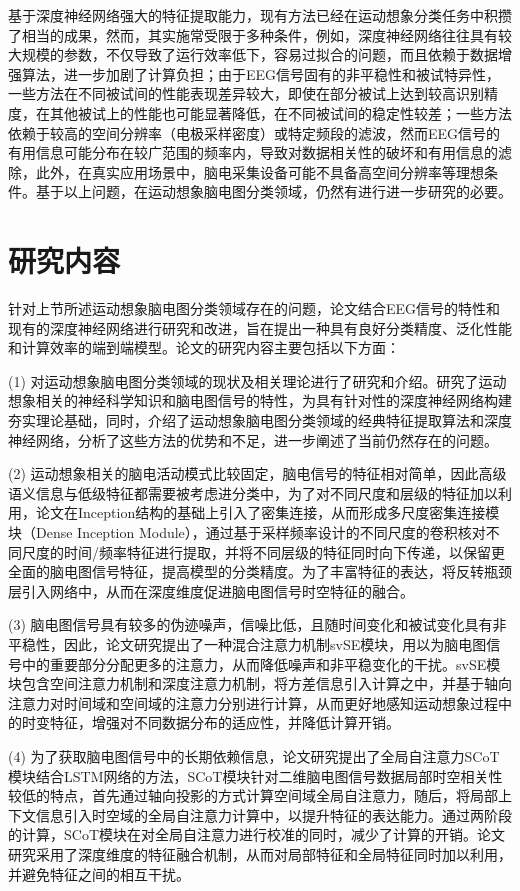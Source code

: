 基于深度神经网络强大的特征提取能力，现有方法已经在运动想象分类任务中积攒了相当的成果，然而，其实施常受限于多种条件，例如，深度神经网络往往具有较大规模的参数，不仅导致了运行效率低下，容易过拟合的问题，而且依赖于数据增强算法，进一步加剧了计算负担；由于EEG信号固有的非平稳性和被试特异性，一些方法在不同被试间的性能表现差异较大，即使在部分被试上达到较高识别精度，在其他被试上的性能也可能显著降低，在不同被试间的稳定性较差；一些方法依赖于较高的空间分辨率（电极采样密度）或特定频段的滤波，然而EEG信号的有用信息可能分布在较广范围的频率内，导致对数据相关性的破坏和有用信息的滤除，此外，在真实应用场景中，脑电采集设备可能不具备高空间分辨率等理想条件。基于以上问题，在运动想象脑电图分类领域，仍然有进行进一步研究的必要。

\section{研究内容}

针对上节所述运动想象脑电图分类领域存在的问题，论文结合EEG信号的特性和现有的深度神经网络进行研究和改进，旨在提出一种具有良好分类精度、泛化性能和计算效率的端到端模型。论文的研究内容主要包括以下方面：

(1) 对运动想象脑电图分类领域的现状及相关理论进行了研究和介绍。研究了运动想象相关的神经科学知识和脑电图信号的特性，为具有针对性的深度神经网络构建夯实理论基础，同时，介绍了运动想象脑电图分类领域的经典特征提取算法和深度神经网络，分析了这些方法的优势和不足，进一步阐述了当前仍然存在的问题。

(2) 运动想象相关的脑电活动模式比较固定，脑电信号的特征相对简单，因此高级语义信息与低级特征都需要被考虑进分类中，为了对不同尺度和层级的特征加以利用，论文在Inception结构的基础上引入了密集连接，从而形成多尺度密集连接模块（Dense Inception Module），通过基于采样频率设计的不同尺度的卷积核对不同尺度的时间/频率特征进行提取，并将不同层级的特征同时向下传递，以保留更全面的脑电图信号特征，提高模型的分类精度。为了丰富特征的表达，将反转瓶颈层引入网络中，从而在深度维度促进脑电图信号时空特征的融合。

(3) 脑电图信号具有较多的伪迹噪声，信噪比低，且随时间变化和被试变化具有非平稳性，因此，论文研究提出了一种混合注意力机制svSE模块，用以为脑电图信号中的重要部分分配更多的注意力，从而降低噪声和非平稳变化的干扰。svSE模块包含空间注意力机制和深度注意力机制，将方差信息引入计算之中，并基于轴向注意力对时间域和空间域的注意力分别进行计算，从而更好地感知运动想象过程中的时变特征，增强对不同数据分布的适应性，并降低计算开销。

(4) 为了获取脑电图信号中的长期依赖信息，论文研究提出了全局自注意力SCoT模块结合LSTM网络的方法，SCoT模块针对二维脑电图信号数据局部时空相关性较低的特点，首先通过轴向投影的方式计算空间域全局自注意力，随后，将局部上下文信息引入时空域的全局自注意力计算中，以提升特征的表达能力。通过两阶段的计算，SCoT模块在对全局自注意力进行校准的同时，减少了计算的开销。论文研究采用了深度维度的特征融合机制，从而对局部特征和全局特征同时加以利用，并避免特征之间的相互干扰。

